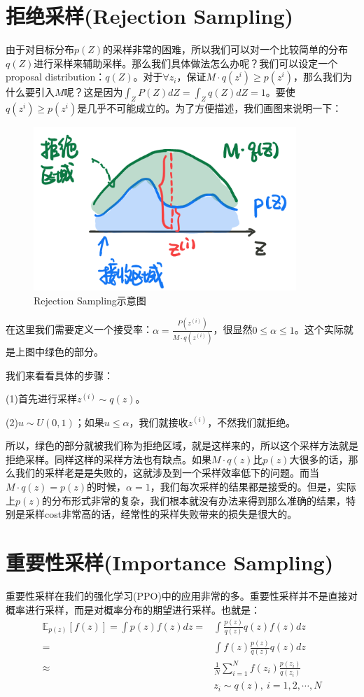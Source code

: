 \documentclass[a4paper]{article}
\begin{document}
\section{拒绝采样(Rejection Sampling)}
由于对目标分布$p(Z)$的采样非常的困难，所以我们可以对一个比较简单的分布$q(Z)$进行采样来辅助采样。那么我们具体做法怎么办呢？我们可以设定一个proposal distribution：$q(Z)$。对于$\forall z_i$，保证$M\cdot q(z^{i}) \geq p(z^{i})$，那么我们为什么要引入$M$呢？这是因为$\int_Z P(Z) dZ = \int_Z q(Z)dZ = 1$。要使$q(z^{i}) \geq p(z^{i})$是几乎不可能成立的。为了方便描述，我们画图来说明一下：
\begin{figure}[H]
    \centering
    \includegraphics[width=.55\textwidth]{微信图片_20191230142201.png}
    \caption{Rejection Sampling示意图}
    \label{fig:my_label_1}
\end{figure}

在这里我们需要定义一个接受率：$\alpha = \frac{P(z^{(i)})}{M\cdot q(z^{(i)})}$，很显然$0 \leq \alpha \leq 1$。这个实际就是上图中绿色的部分。

我们来看看具体的步骤：

(1)首先进行采样$z^{(i)} \sim q(z)$。

(2)$u \sim U(0,1)$；如果$u \leq \alpha$，我们就接收$z^{(i)}$，不然我们就拒绝。

所以，绿色的部分就被我们称为拒绝区域，就是这样来的，所以这个采样方法就是拒绝采样。同样这样的采样方法也有缺点。如果$M\cdot q(z)$比$p(z)$大很多的话，那么我们的采样老是是失败的，这就涉及到一个采样效率低下的问题。而当$M\cdot q(z) = p(z)$的时候，$\alpha = 1$，我们每次采样的结果都是接受的。但是，实际上$p(z)$的分布形式非常的复杂，我们根本就没有办法来得到那么准确的结果，特别是采样cost非常高的话，经常性的采样失败带来的损失是很大的。

\section{重要性采样(Importance Sampling)}
重要性采样在我们的强化学习(PPO)中的应用非常的多。重要性采样并不是直接对概率进行采样，而是对概率分布的期望进行采样。也就是：
\begin{equation}
    \begin{split}
        \mathbb{E}_{p(z)}[f(z)] = \int p(z)f(z)dz 
        = & \int \frac{p(z)}{q(z)} q(z)f(z)dz \\
        = & \int f(z)\frac{p(z)}{q(z)} q(z)dz \\
        \approx & \frac{1}{N} \sum_{i=1}^N f(z_i) \frac{p(z_i)}{q(z_i)} \\
        & z_i \sim q(z),\ i = 1,2,\cdots,N
    \end{split}
\end{equation}
\end{document}
